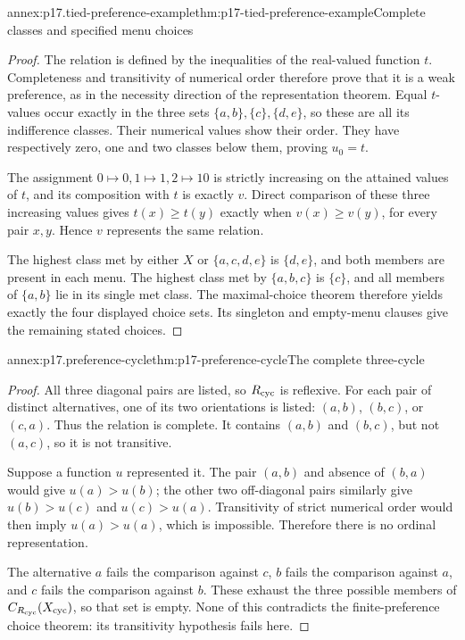 \begin{annexitem}{annex:p17.tied-preference-example}{thm:p17-tied-preference-example}{Complete classes and specified menu choices}
\begin{proof}
The relation is defined by the inequalities of the real-valued function
\(t\). Completeness and transitivity of numerical order therefore prove
that it is a weak preference, as in the necessity direction of the
representation theorem. Equal \(t\)-values occur exactly in the three
sets \(\{a,b\},\{c\},\{d,e\}\), so these are all its indifference
classes. Their numerical values show their order. They have respectively
zero, one and two classes below them, proving \(u_0=t\).

The assignment \(0\mapsto0,1\mapsto1,2\mapsto10\) is strictly
increasing on the attained values of \(t\), and its composition with
\(t\) is exactly \(v\). Direct comparison of these three increasing
values gives \(t(x)\geq t(y)\) exactly when \(v(x)\geq v(y)\),
for every pair \(x,y\). Hence \(v\) represents the same relation.

The highest class met by either \(X\) or \(\{a,c,d,e\}\) is
\(\{d,e\}\), and both members are present in each menu. The highest
class met by \(\{a,b,c\}\) is \(\{c\}\), and all members of
\(\{a,b\}\) lie in its single met class. The maximal-choice theorem
therefore yields exactly the four displayed choice sets. Its singleton
and empty-menu clauses give the remaining stated choices.
\end{proof}
\end{annexitem}

\begin{annexitem}{annex:p17.preference-cycle}{thm:p17-preference-cycle}{The complete three-cycle}
\begin{proof}
All three diagonal pairs are listed, so \(R_{\rm cyc}\) is reflexive.
For each pair of distinct alternatives, one of its two orientations is
listed: \((a,b)\), \((b,c)\), or \((c,a)\). Thus the relation is
complete. It contains \((a,b)\) and \((b,c)\), but not \((a,c)\),
so it is not transitive.

Suppose a function \(u\) represented it. The pair \((a,b)\) and
absence of \((b,a)\) would give \(u(a)>u(b)\); the other two
off-diagonal pairs similarly give \(u(b)>u(c)\) and \(u(c)>u(a)\).
Transitivity of strict numerical order would then imply \(u(a)>u(a)\),
which is impossible. Therefore there is no ordinal representation.

The alternative \(a\) fails the comparison against \(c\), \(b\)
fails the comparison against \(a\), and \(c\) fails the comparison
against \(b\). These exhaust the three possible members of
\(C_{R_{\rm cyc}}(X_{\rm cyc})\), so that set is empty. None of
this contradicts the finite-preference choice theorem: its transitivity
hypothesis fails here.
\end{proof}
\end{annexitem}

